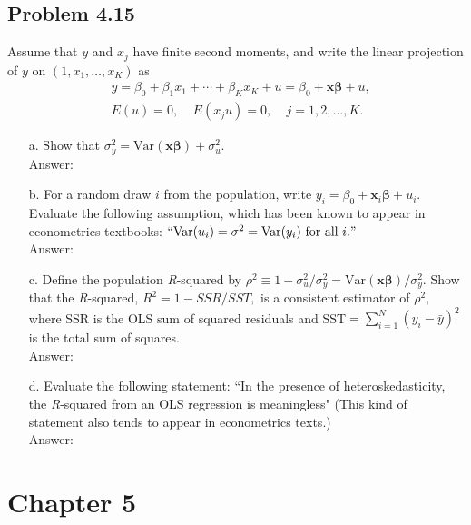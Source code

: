 \documentclass[10pt]{article}
\newcommand{\V}{\text{Var}}
\begin{document}
\subsection*{Problem 4.15}
Assume that $y$ and $x_j$ have finite second moments, and write the linear projection of $y$ on $(1,x_1,\ldots,x_K)$ as
\begin{align*}
    &y=\beta_0+\beta_1 x_1+\cdots +\beta_K x_K +u=\beta_0 + \textbf{x}\pmb{\beta}+u,\\
    &E(u)=0,\ \ \ \ \ E(x_j u)=0, \ \ \ \ \ j=1,2,\ldots,K.
\end{align*}
\begin{enumerate}
\item[a.] Show that $\sigma_y^2=\V(\textbf{x}\pmb{\beta})+\sigma_u^2.$ 
\\ Answer:\\

\item[b.] For a random draw $i$ from the population, write $y_i=\beta_0+\textbf{x}_i\pmb{\beta}+u_i.$ Evaluate the following assumption, which has been known to appear in econometrics textbooks: $``\V(u_i)=\sigma^2=\V(y_i) \text{ for all }i."$
\\ Answer:\\

\item[c.] Define the population \textit{R}-squared by $\rho^2 \equiv 1-\sigma_u^2 / \sigma_y^2=\V(\textbf{x}\pmb{\beta})/\sigma_y^2.$ Show that the \textit{R}-squared, $R^2=1-SSR/SST,$ is a consistent estimator of $\rho^2,$ where SSR is the OLS sum of squared residuals and SST$=\sum_{i=1}^N (y_i-\bar{y})^2$ is the total sum of squares.
\\ Answer:\\

\item[d.] Evaluate the following statement: ``In the presence of heteroskedasticity, the \textit{R}-squared from an OLS regression is meaningless" (This kind of statement also tends to appear in econometrics texts.)
\\ Answer:\\
\end{enumerate}

\section*{Chapter 5}
\end{document}

